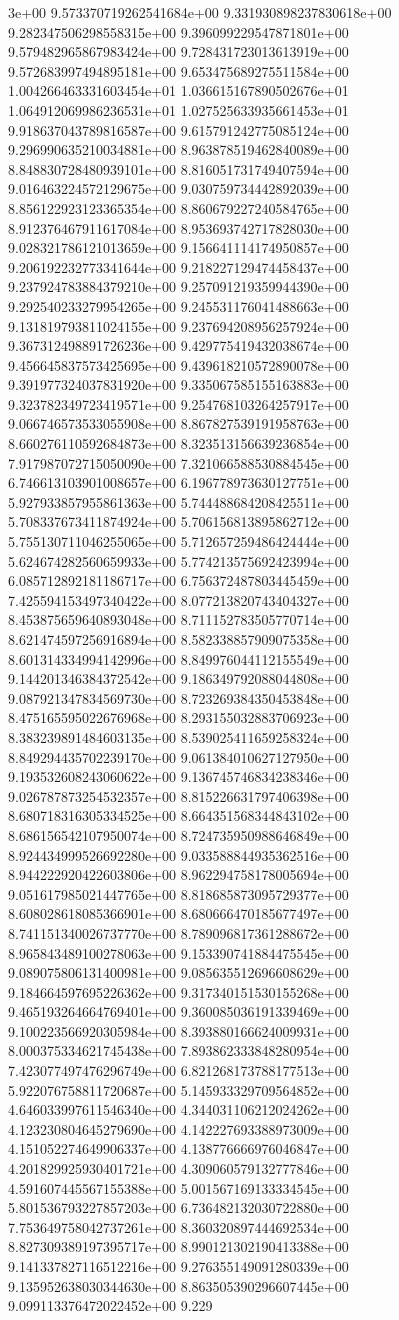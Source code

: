 3e+00	9.573370719262541684e+00	9.331930898237830618e+00	9.282347506298558315e+00	9.396099229547871801e+00	9.579482965867983424e+00	9.728431723013613919e+00	9.572683997494895181e+00	9.653475689275511584e+00	1.004266463331603454e+01	1.036615167890502676e+01	1.064912069986236531e+01	1.027525633935661453e+01	9.918637043789816587e+00	9.615791242775085124e+00	9.296990635210034881e+00	8.963878519462840089e+00	8.848830728480939101e+00	8.816051731749407594e+00	9.016463224572129675e+00	9.030759734442892039e+00	8.856122923123365354e+00	8.860679227240584765e+00	8.912376467911617084e+00	8.953693742717828030e+00	9.028321786121013659e+00	9.156641114174950857e+00	9.206192232773341644e+00	9.218227129474458437e+00	9.237924783884379210e+00	9.257091219359944390e+00	9.292540233279954265e+00	9.245531176041488663e+00	9.131819793811024155e+00	9.237694208956257924e+00	9.367312498891726236e+00	9.429775419432038674e+00	9.456645837573425695e+00	9.439618210572890078e+00	9.391977324037831920e+00	9.335067585155163883e+00	9.323782349723419571e+00	9.254768103264257917e+00	9.066746573533055908e+00	8.867827539191958763e+00	8.660276110592684873e+00	8.323513156639236854e+00	7.917987072715050090e+00	7.321066588530884545e+00	6.746613103901008657e+00	6.196778973630127751e+00	5.927933857955861363e+00	5.744488684208425511e+00	5.708337673411874924e+00	5.706156813895862712e+00	5.755130711046255065e+00	5.712657259486424444e+00	5.624674282560659933e+00	5.774213575692423994e+00	6.085712892181186717e+00	6.756372487803445459e+00	7.425594153497340422e+00	8.077213820743404327e+00	8.453875659640893048e+00	8.711152783505770714e+00	8.621474597256916894e+00	8.582338857909075358e+00	8.601314334994142996e+00	8.849976044112155549e+00	9.144201346384372542e+00	9.186349792088044808e+00	9.087921347834569730e+00	8.723269384350453848e+00	8.475165595022676968e+00	8.293155032883706923e+00	8.383239891484603135e+00	8.539025411659258324e+00	8.849294435702239170e+00	9.061384010627127950e+00	9.193532608243060622e+00	9.136745746834238346e+00	9.026787873254532357e+00	8.815226631797406398e+00	8.680718316305334525e+00	8.664351568344843102e+00	8.686156542107950074e+00	8.724735950988646849e+00	8.924434999526692280e+00	9.033588844935362516e+00	8.944222920422603806e+00	8.962294758178005694e+00	9.051617985021447765e+00	8.818685873095729377e+00	8.608028618085366901e+00	8.680666470185677497e+00	8.741151340026737770e+00	8.789096817361288672e+00	8.965843489100278063e+00	9.153390741884475545e+00	9.089075806131400981e+00	9.085635512696608629e+00	9.184664597695226362e+00	9.317340151530155268e+00	9.465193264664769401e+00	9.360085036191339469e+00	9.100223566920305984e+00	8.393880166624009931e+00	8.000375334621745438e+00	7.893862333848280954e+00	7.423077497476296749e+00	6.821268173788177513e+00	5.922076758811720687e+00	5.145933329709564852e+00	4.646033997611546340e+00	4.344031106212024262e+00	4.123230804645279690e+00	4.142227693388973009e+00	4.151052274649906337e+00	4.138776666976046847e+00	4.201829925930401721e+00	4.309060579132777846e+00	4.591607445567155388e+00	5.001567169133334545e+00	5.801536793227857203e+00	6.736482132030722880e+00	7.753649758042737261e+00	8.360320897444692534e+00	8.827309389197395717e+00	8.990121302190413388e+00	9.141337827116512216e+00	9.276355149091280339e+00	9.135952638030344630e+00	8.863505390296607445e+00	9.099113376472022452e+00	9.229